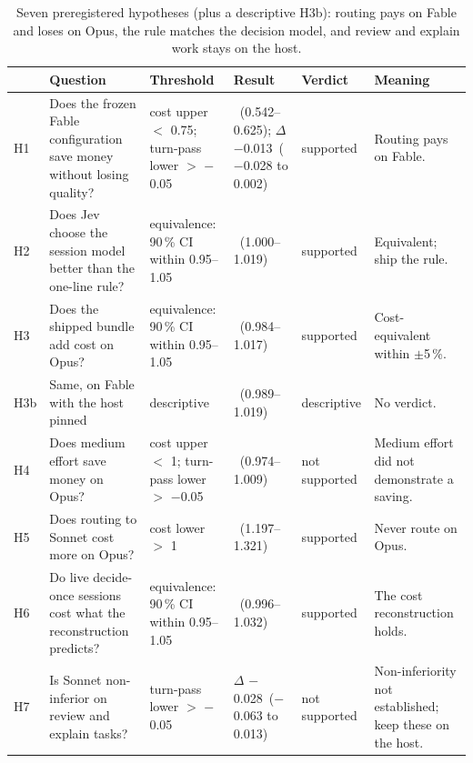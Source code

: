 \documentclass[11pt,letterpaper]{article}
\newcommand{\NIMargin}{$-$0.05}
\newcommand{\SHFiveCI}{1.197--1.321}
\newcommand{\SHFiveRatio}{1.255}
\newcommand{\SHFiveVerdict}{supported}
\newcommand{\SHFourCI}{0.974--1.009}
\newcommand{\SHFourRatio}{0.992}
\newcommand{\SHFourVerdict}{not supported}
\newcommand{\SHOneCI}{0.542--0.625}
\newcommand{\SHOneDtp}{$-$0.013}
\newcommand{\SHOneDtpCI}{$-$0.028 to 0.002}
\newcommand{\SHOneRatio}{0.581}
\newcommand{\SHOneVerdict}{supported}
\newcommand{\SHSevenDtp}{$-$0.028}
\newcommand{\SHSevenDtpCI}{$-$0.063 to 0.013}
\newcommand{\SHSevenVerdict}{not supported}
\newcommand{\SHSixCINinety}{0.996--1.032}
\newcommand{\SHSixRatio}{1.014}
\newcommand{\SHSixVerdict}{supported}
\newcommand{\SHThreeBCINinety}{0.989--1.019}
\newcommand{\SHThreeBRatio}{1.004}
\newcommand{\SHThreeCINinety}{0.984--1.017}
\newcommand{\SHThreeRatio}{0.999}
\newcommand{\SHThreeVerdict}{supported}
\newcommand{\SHTwoCINinety}{1.000--1.019}
\newcommand{\SHTwoRatio}{1.008}
\newcommand{\SHTwoVerdict}{supported}
\newcommand{\SThreshOne}{0.75}
\begin{document}
\begin{table}[tbp]
\centering\footnotesize
\caption{Seven preregistered hypotheses (plus a descriptive H3b): routing pays on Fable and loses on Opus, the rule
matches the decision model, and review and explain work stays on the host.}
\label{tab:ghyp}
\begin{tabularx}{\textwidth}{@{}l >{\raggedright\arraybackslash}p{} >{\raggedright\arraybackslash}p{}
  >{\raggedright\arraybackslash}p{} >{\raggedright\arraybackslash}p{} >{\raggedright\arraybackslash}X@{}}
\toprule
 & Question & Threshold & Result & Verdict & Meaning \\
\midrule
H1 & Does the frozen Fable configuration save money without losing quality? & cost upper $<$ \SThreshOne; turn-pass lower
  $>$ \NIMargin & \SHOneRatio\ (\SHOneCI); $\Delta$ \SHOneDtp\ (\SHOneDtpCI) & \SHOneVerdict & Routing pays on Fable. \\
H2 & Does Jev choose the session model better than the one-line rule? & equivalence: 90\,\% CI within 0.95--1.05 &
  \SHTwoRatio\ (\SHTwoCINinety) & \SHTwoVerdict & Equivalent; ship the rule. \\
H3 & Does the shipped bundle add cost on Opus? & equivalence: 90\,\% CI within 0.95--1.05 & \SHThreeRatio\
  (\SHThreeCINinety) & \SHThreeVerdict & Cost-equivalent within $\pm$5\,\%. \\
H3b & Same, on Fable with the host pinned & descriptive & \SHThreeBRatio\ (\SHThreeBCINinety) & descriptive & No
  verdict. \\
H4 & Does medium effort save money on Opus? & cost upper $<$ 1; turn-pass lower $>$ \NIMargin & \SHFourRatio\
  (\SHFourCI) & \SHFourVerdict & Medium effort did not demonstrate a saving. \\
H5 & Does routing to Sonnet cost more on Opus? & cost lower $>$ 1 & \SHFiveRatio\ (\SHFiveCI) & \SHFiveVerdict & Never
  route on Opus. \\
H6 & Do live decide-once sessions cost what the reconstruction predicts? & equivalence: 90\,\% CI within 0.95--1.05 &
  \SHSixRatio\ (\SHSixCINinety) & \SHSixVerdict & The cost reconstruction holds. \\
H7 & Is Sonnet non-inferior on review and explain tasks? & turn-pass lower $>$ \NIMargin & $\Delta$ \SHSevenDtp\
  (\SHSevenDtpCI) & \SHSevenVerdict & Non-inferiority not established; keep these on the host. \\
\bottomrule
\end{tabularx}
\end{table}
\end{document}
